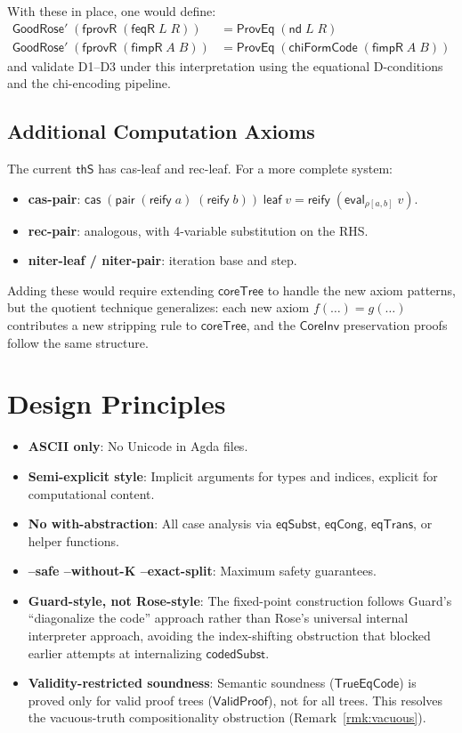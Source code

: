 \documentclass[11pt]{article}
\newcommand{\nd}{\mathsf{nd}}
\newcommand{\cas}{\mathsf{cas}}
\newcommand{\eval}{\mathsf{eval}}
\newcommand{\reify}{\mathsf{reify}}
\newcommand{\thS}{\mathsf{thS}}
\newcommand{\codedSubst}{\mathsf{codedSubst}}
\newcommand{\ValidProof}{\mathsf{ValidProof}}
\newcommand{\TrueEqCode}{\mathsf{TrueEqCode}}
\newcommand{\coreTree}{\mathsf{coreTree}}
\newcommand{\CoreInv}{\mathsf{CoreInv}}
\begin{document}
With these in place, one would define:
\begin{align*}
  \mathsf{GoodRose'}\;(\mathsf{fprovR}\;(\mathsf{feqR}\;L\;R))
    &= \mathsf{ProvEq}\;(\nd\;L\;R) \\
  \mathsf{GoodRose'}\;(\mathsf{fprovR}\;(\mathsf{fimpR}\;A\;B))
    &= \mathsf{ProvEq}\;(\mathsf{chiFormCode}\;(\mathsf{fimpR}\;A\;B))
\end{align*}
and validate D1--D3 under this interpretation using the equational D-conditions
and the chi-encoding pipeline.

\subsection{Additional Computation Axioms}

The current $\thS$ has cas-leaf and rec-leaf. For a more complete system:
\begin{itemize}
  \item \textbf{cas-pair}: $\cas\;(\mathsf{pair}\;(\reify\;a)\;(\reify\;b))\;\mathsf{leaf}\;v
    = \reify\;(\eval_{\rho[a,b]}\;v)$.
  \item \textbf{rec-pair}: analogous, with 4-variable substitution on the RHS.
  \item \textbf{niter-leaf / niter-pair}: iteration base and step.
\end{itemize}
Adding these would require extending $\coreTree$ to handle the new axiom patterns,
but the quotient technique generalizes: each new axiom $f(\ldots) = g(\ldots)$
contributes a new stripping rule to $\coreTree$, and the $\CoreInv$ preservation
proofs follow the same structure.

\section{Design Principles}

\begin{itemize}
  \item \textbf{ASCII only}: No Unicode in Agda files.
  \item \textbf{Semi-explicit style}: Implicit arguments for types and indices,
    explicit for computational content.
  \item \textbf{No with-abstraction}: All case analysis via $\mathsf{eqSubst}$,
    $\mathsf{eqCong}$, $\mathsf{eqTrans}$, or helper functions.
  \item \textbf{--safe --without-K --exact-split}: Maximum safety guarantees.
  \item \textbf{Guard-style, not Rose-style}: The fixed-point construction
    follows Guard's ``diagonalize the code'' approach rather than Rose's
    universal internal interpreter approach, avoiding the index-shifting
    obstruction that blocked earlier attempts at internalizing $\codedSubst$.
  \item \textbf{Validity-restricted soundness}: Semantic soundness
    ($\TrueEqCode$) is proved only for valid proof trees ($\ValidProof$),
    not for all trees. This resolves the vacuous-truth compositionality
    obstruction (Remark~\ref{rmk:vacuous}).
\end{itemize}
\end{document}
